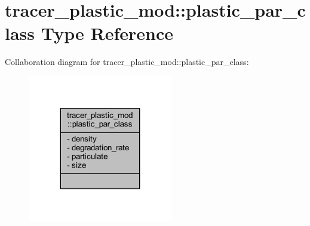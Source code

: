 \hypertarget{structtracer__plastic__mod_1_1plastic__par__class}{}\section{tracer\+\_\+plastic\+\_\+mod\+:\+:plastic\+\_\+par\+\_\+class Type Reference}
\label{structtracer__plastic__mod_1_1plastic__par__class}


Collaboration diagram for tracer\+\_\+plastic\+\_\+mod\+:\+:plastic\+\_\+par\+\_\+class\+:
\nopagebreak
\begin{figure}[H]
\begin{center}
\leavevmode
\includegraphics[width=179pt]{structtracer__plastic__mod_1_1plastic__par__class__coll__graph}
\end{center}
\end{figure}

